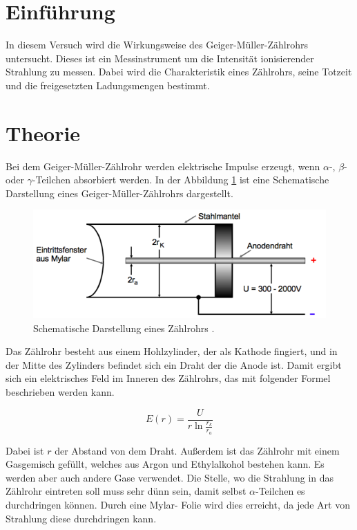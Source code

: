 \section{Einführung}
In diesem Versuch wird die Wirkungsweise des Geiger-Müller-Zählrohrs untersucht.
Dieses ist ein Messinstrument um die Intensität ionisierender Strahlung zu messen.
Dabei wird die Charakteristik eines Zählrohrs, seine Totzeit und die freigesetzten Ladungsmengen
bestimmt.

\section{Theorie}

Bei dem Geiger-Müller-Zählrohr werden elektrische Impulse erzeugt, wenn $\alpha$-,
$\beta$- oder $\gamma$-Teilchen absorbiert werden. In der Abbildung \ref{abb:1} ist eine
Schematische Darstellung eines Geiger-Müller-Zählrohrs dargestellt.

\begin{figure}[H]
  \centering
  \includegraphics[width=\textwidth]{content/Zaehlrohr.png}
  \caption{Schematische Darstellung eines Zählrohrs \cite{1}.}
  \label{abb:1}
\end{figure}

Das Zählrohr besteht aus einem Hohlzylinder, der als Kathode fingiert, und in der
Mitte des Zylinders befindet sich ein Draht der die Anode ist. Damit ergibt sich
ein elektrisches Feld im Inneren des Zählrohrs, das mit folgender Formel beschrieben
werden kann.

\begin{equation*}
  E(r) = \frac{U}{r \ln{\frac{r_k}{r_a}}}
\end{equation*}

Dabei ist $r$ der Abstand von dem Draht. Außerdem ist das Zählrohr mit einem Gasgemisch
gefüllt, welches aus Argon und Ethylalkohol bestehen kann. Es werden aber auch andere
Gase verwendet. Die Stelle, wo die Strahlung in das Zählrohr eintreten soll muss sehr
dünn sein, damit selbst $\alpha$-Teilchen es durchdringen können. Durch eine Mylar-
Folie wird dies erreicht, da jede Art von Strahlung diese durchdringen kann.


